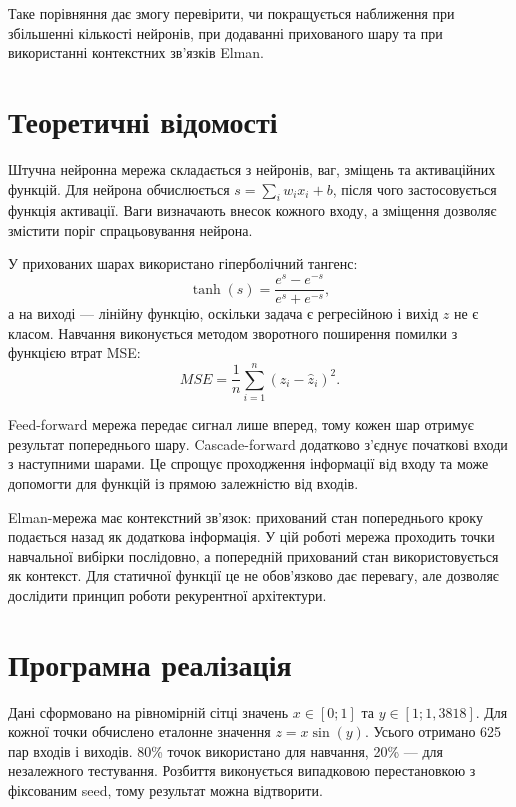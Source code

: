 \documentclass[12pt,a4paper]{article}
\begin{document}
Таке порівняння дає змогу перевірити, чи покращується наближення при збільшенні кількості нейронів, при додаванні прихованого шару та при використанні контекстних зв'язків Elman.

\section{Теоретичні відомості}
Штучна нейронна мережа складається з нейронів, ваг, зміщень та активаційних функцій. Для нейрона обчислюється $s=\sum_iw_ix_i+b$, після чого застосовується функція активації. Ваги визначають внесок кожного входу, а зміщення дозволяє змістити поріг спрацьовування нейрона.

У прихованих шарах використано гіперболічний тангенс:
\begin{equation}\tanh(s)=\frac{e^s-e^{-s}}{e^s+e^{-s}},\end{equation}
а на виході --- лінійну функцію, оскільки задача є регресійною і вихід $z$ не є класом. Навчання виконується методом зворотного поширення помилки з функцією втрат MSE:
\begin{equation}MSE=\frac{1}{n}\sum_{i=1}^{n}(z_i-\hat z_i)^2.\end{equation}

Feed-forward мережа передає сигнал лише вперед, тому кожен шар отримує результат попереднього шару. Cascade-forward додатково з'єднує початкові входи з наступними шарами. Це спрощує проходження інформації від входу та може допомогти для функцій із прямою залежністю від входів.

Elman-мережа має контекстний зв'язок: прихований стан попереднього кроку подається назад як додаткова інформація. У цій роботі мережа проходить точки навчальної вибірки послідовно, а попередній прихований стан використовується як контекст. Для статичної функції це не обов'язково дає перевагу, але дозволяє дослідити принцип роботи рекурентної архітектури.

\section{Програмна реалізація}
Дані сформовано на рівномірній сітці значень $x\in[0;1]$ та $y\in[1;1{,}3818]$. Для кожної точки обчислено еталонне значення $z=x\sin(y)$. Усього отримано 625 пар входів і виходів. 80\% точок використано для навчання, 20\% --- для незалежного тестування. Розбиття виконується випадковою перестановкою з фіксованим seed, тому результат можна відтворити.
\end{document}
